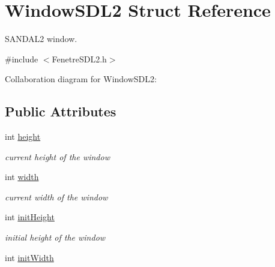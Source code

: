 \hypertarget{structWindowSDL2}{}\section{Window\+S\+D\+L2 Struct Reference}
\label{structWindowSDL2}


S\+A\+N\+D\+A\+L2 window.  




{\ttfamily \#include $<$Fenetre\+S\+D\+L2.\+h$>$}



Collaboration diagram for Window\+S\+D\+L2\+:
\subsection*{Public Attributes}
\begin{DoxyCompactItemize}
\item 
int \hyperlink{structWindowSDL2_a6a3ca624143f2bf9852cb623d302c56d}{height}\hypertarget{structWindowSDL2_a6a3ca624143f2bf9852cb623d302c56d}{}\label{structWindowSDL2_a6a3ca624143f2bf9852cb623d302c56d}

\begin{DoxyCompactList}\small\item\em current height of the window \end{DoxyCompactList}\item 
int \hyperlink{structWindowSDL2_ade5a776a9e5a2812542ee9b539d66960}{width}\hypertarget{structWindowSDL2_ade5a776a9e5a2812542ee9b539d66960}{}\label{structWindowSDL2_ade5a776a9e5a2812542ee9b539d66960}

\begin{DoxyCompactList}\small\item\em current width of the window \end{DoxyCompactList}\item 
int \hyperlink{structWindowSDL2_ad18f000e45db56098bd8c2ea87e75019}{init\+Height}\hypertarget{structWindowSDL2_ad18f000e45db56098bd8c2ea87e75019}{}\label{structWindowSDL2_ad18f000e45db56098bd8c2ea87e75019}

\begin{DoxyCompactList}\small\item\em initial height of the window \end{DoxyCompactList}\item 
int \hyperlink{structWindowSDL2_ab6f213858040a055c371f947c4a71fca}{init\+Width}\hypertarget{structWindowSDL2_ab6f213858040a055c371f947c4a71fca}{}\label{structWindowSDL2_ab6f213858040a055c371f947c4a71fca}


\end{DoxyCompactItemize}
